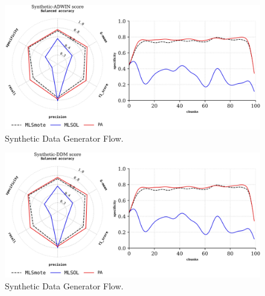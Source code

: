 \begin{figure}[!ht]
	\centering
	\includegraphics[width=1\linewidth]{4_Taxonomy/figures/exp_5.png}
	\caption{Synthetic Data Generator Flow.}
	\label{fig:4_first_proposal_result_exp_5}
\end{figure}

\begin{figure}[!ht]
	\centering
	\includegraphics[width=1\linewidth]{4_Taxonomy/figures/exp_6.png}
	\caption{Synthetic Data Generator Flow.}
	\label{fig:4_first_proposal_result_exp_6}
\end{figure}


